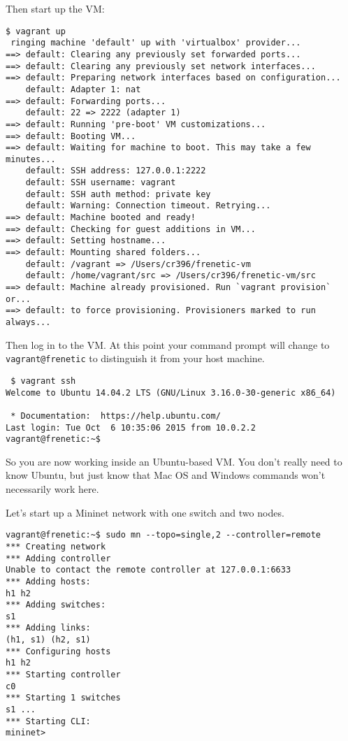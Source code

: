 Then start up the VM:

\begin{verbatim}
$ vagrant up
 ringing machine 'default' up with 'virtualbox' provider...
==> default: Clearing any previously set forwarded ports...
==> default: Clearing any previously set network interfaces...
==> default: Preparing network interfaces based on configuration...
    default: Adapter 1: nat
==> default: Forwarding ports...
    default: 22 => 2222 (adapter 1)
==> default: Running 'pre-boot' VM customizations...
==> default: Booting VM...
==> default: Waiting for machine to boot. This may take a few minutes...
    default: SSH address: 127.0.0.1:2222
    default: SSH username: vagrant
    default: SSH auth method: private key
    default: Warning: Connection timeout. Retrying...
==> default: Machine booted and ready!
==> default: Checking for guest additions in VM...
==> default: Setting hostname...
==> default: Mounting shared folders...
    default: /vagrant => /Users/cr396/frenetic-vm
    default: /home/vagrant/src => /Users/cr396/frenetic-vm/src
==> default: Machine already provisioned. Run `vagrant provision` or...
==> default: to force provisioning. Provisioners marked to run always...
\end{verbatim}

Then log in to the VM.  At this point your command prompt will change to {\tt vagrant@frenetic} to distinguish it
from your host machine.

\begin{verbatim}
 $ vagrant ssh
Welcome to Ubuntu 14.04.2 LTS (GNU/Linux 3.16.0-30-generic x86_64)

 * Documentation:  https://help.ubuntu.com/
Last login: Tue Oct  6 10:35:06 2015 from 10.0.2.2
vagrant@frenetic:~$ 
\end{verbatim}

So you are now working inside an Ubuntu-based VM.  You don't really need to know Ubuntu, but just know that Mac OS and Windows commands won't necessarily work here.  

Let's start up a Mininet network with one switch and two nodes.

\begin{verbatim}
vagrant@frenetic:~$ sudo mn --topo=single,2 --controller=remote
*** Creating network
*** Adding controller
Unable to contact the remote controller at 127.0.0.1:6633
*** Adding hosts:
h1 h2
*** Adding switches:
s1
*** Adding links:
(h1, s1) (h2, s1)
*** Configuring hosts
h1 h2
*** Starting controller
c0
*** Starting 1 switches
s1 ...
*** Starting CLI:
mininet>
\end{verbatim}

